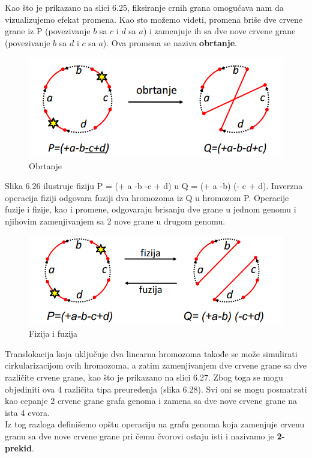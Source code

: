 Kao što je prikazano na slici 6.25, fiksiranje crnih grana omogućava nam da vizualizujemo efekat promena. Kao sto možemo videti, promena briše dve crvene grane iz P (povezivanje $b$ sa $c$ i $d$ sa $a$) i zamenjuje ih sa dve nove crvene grane (povezivanje $b$ sa $d$ i $c$ sa $a$). Ova promena se naziva \textbf{obrtanje}.\\

\begin{figure}[h!]
\centering
\includegraphics[scale=0.6]{poglavlja/6/slike/obrtanje.PNG}
\caption{Obrtanje}
\label{slika:X}
\end{figure}

Slika 6.26 ilustruje fiziju P = (+ a -b -c + d) u Q = (+ a -b) (- c + d).
Inverzna operacija fiziji odgovara fuziji dva hromozoma iz Q u hromozom P. Operacije fuzije i fizije, kao i promene, odgovaraju brisanju dve grane u jednom genomu i njihovim zamenjivanjem sa 2 nove grane u drugom genomu.\\

\begin{figure}[h!]
\centering
\includegraphics[scale=0.6]{poglavlja/6/slike/fizija_fusija.PNG}
\caption{Fizija i fuzija}
\label{slika:X}
\end{figure}

\newpage
Translokacija koja uključuje dva linearna hromozoma takođe se može simulirati cirkularizacijom ovih hromozoma, a zatim zamenjivanjem dve crvene grane sa dve različite crvene grane, kao što je prikazano na slici 6.27. Zbog toga se mogu objediniti ova 4 različita tipa preuređenja (slika 6.28). Svi oni se mogu posmatrati kao cepanje 2 crvene grane grafa genoma i zamena sa dve nove crvene grane na ista 4 cvora. \\
Iz tog razloga definišemo opštu operaciju na grafu genoma
koja zamenjuje crvenu granu sa dve nove crvene grane pri čemu čvorovi ostaju isti i nazivamo je \textbf{2-prekid}.\\

